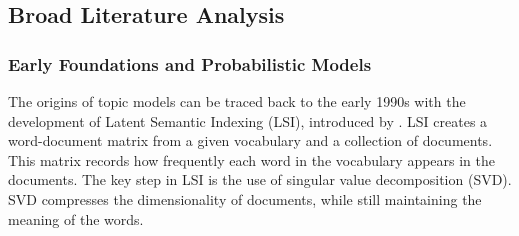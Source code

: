 \documentclass{article}
\newcommand{\cX}{\mathcal{X}}
\newcommand{\cL}{\mathcal{L}}
\newcommand{\cY}{\mathcal{Y}}
\newcommand{\bX}{\mathbf{X}}
\newcommand{\bY}{\mathbf{Y}}
\begin{document}
\subsection{Broad Literature Analysis}\label{sec:broadliterature}


\subsubsection{Early Foundations and Probabilistic Models}
The origins of topic models can be traced back to the early 1990s with the development of Latent Semantic Indexing (LSI), introduced by \citet{deerwester_indexing_1990}. LSI creates a word-document matrix from a given vocabulary and a collection of documents. This matrix records how frequently each word in the vocabulary appears in the documents. The key step in LSI is the use of singular value decomposition (SVD). SVD compresses the dimensionality of documents, while still maintaining the meaning of the words.
\end{document}
